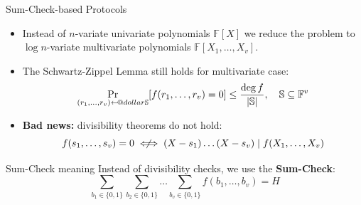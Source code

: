 \documentclass{zkdl-presentation-template}
\makeatletter
\newcommand\leftarrowS{\leftarrow\joinrel\smalldollar}
\newcommand{\smalldollar}{\mathrel{\mathpalette\small@dollar\relax}}
\newcommand{\small@dollar}[2]{%
  \vcenter{\hbox{%
    $#1\textnormal{\fontsize{0.7\dimexpr\f@size pt}{0}\selectfont\$}$%
  }}%
}
\makeatother
\begin{document}
    \begin{frame}{Sum-Check-based Protocols}
        \begin{itemize}
            \item Instead of $n$-variate univariate polynomials $\mathbb{F}[X]$
            we reduce the problem to $\log n$-variate multivariate polynomials
            $\mathbb{F}[X_1,\dots,X_v]$.
            \item \pause The Schwartz-Zippel Lemma still holds for multivariate case:
            \begin{equation*}
                \mathop{\text{Pr}}_{(r_1,\dots,r_v) \leftarrowS \mathbb{S}}[f(r_1,\dots,r_v) = 0] \leq \frac{\deg f}{|\mathbb{S}|}, \quad \mathbb{S} \subseteq \mathbb{F}^v
            \end{equation*}
            \item \pause \textcolor{red!80!black}{\textbf{Bad news:}} divisibility theorems do not hold:
            \begin{equation*}
                f(s_1,\dots,s_v) = 0 \centernot\iff (X-s_1)\dots (X-s_v) \mid f(X_1,\dots,X_v)
            \end{equation*}
        \end{itemize}

        \pause\begin{alertblock}{Sum-Check meaning}
            Instead of divisibility checks, we use the \textbf{Sum-Check}:
            \begin{equation*}
                \sum_{b_1 \in \{0,1\}}\sum_{b_2 \in \{0,1\}}\dots \sum_{b_v \in \{0,1\}} f(b_1,\dots,b_v) = H
            \end{equation*}
        \end{alertblock}
    \end{frame}
\end{document}
